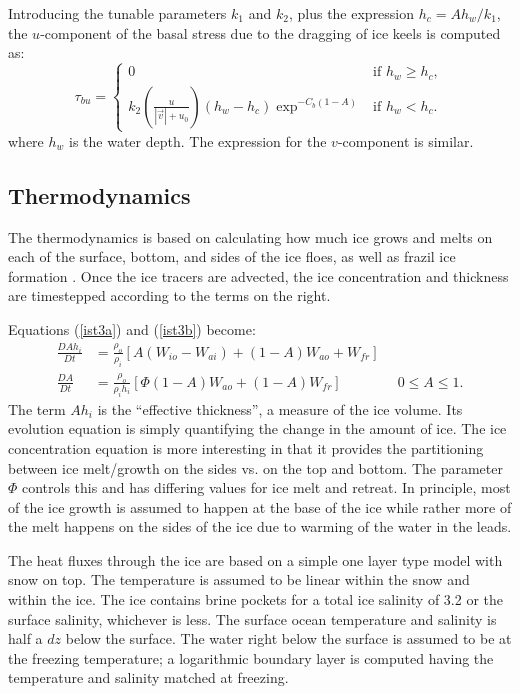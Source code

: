 Introducing the tunable parameters $k_1$ and $k_2$, plus the
expression $h_c = A h_w/k_1$, the $u$-component of the basal
stress due to the dragging of ice keels is computed as:
\begin{equation}
  \tau_{bu} = 
    \begin{cases}
      0& \text{if $h_w \geq h_c$},\\
      k_2 \left( \frac{u}{|\vec{v}| + u_0} \right)
            (h_w-h_c)\exp^{-C_b(1-A)}& \text{if $h_w < h_c$}.
    \end{cases}
\end{equation}
where $h_w$ is the water depth.
The expression for the $v$-component is similar.

\subsection{Thermodynamics}
\label{Growth}

The thermodynamics is based on calculating how much ice grows and
melts on each of the surface, bottom, and sides of the ice floes,
as well as frazil ice formation \citep{Mellor89}.
Once the ice tracers are advected, the ice concentration and
thickness are timestepped according to the terms on the right.

Equations (\ref{ist3a}) and (\ref{ist3b}) become:
\begin{align}
  \frac{D A h_i }{D t}
  & = \frac{\rho_o }{ \rho_i} \left[ A (W_{io} - W_{ai}) + (1-A) W_{ao}
  + W_{fr} \right]
\label{ist4a} \\
  \frac{D A }{ D t}
  & = \frac{\rho_o}{ \rho_i h_i} \left[ \Phi (1-A) W_{ao} + (1-A)
  W_{fr} \right] \qquad \qquad 0 \leq A \leq 1 .
\label{ist4b}
\end{align}
The term $Ah_i$ is the ``effective thickness'', a measure of the ice
volume. Its evolution equation is simply quantifying the change in
the amount of ice. The ice concentration equation is more interesting in
that it provides the partitioning between ice melt/growth on the sides
vs. on the top and bottom. The parameter $\Phi$ controls this and has
differing values for ice melt and retreat. In principle, most of the ice
growth is assumed to happen at the base of the ice while rather more of
the melt happens on the sides of the ice due to warming of the water in
the leads.

The heat fluxes through the ice are based on a simple one layer
\citet{Semtner76a} type model with snow on top. The temperature is
assumed to be linear within the snow and within the ice. The ice contains
brine pockets for a total ice salinity of 3.2 or the surface salinity,
whichever is less. The surface ocean temperature and salinity is half a
$dz$ below the surface. The water right below the surface is assumed to
be at the freezing temperature; a logarithmic boundary layer is computed
having the temperature and salinity matched at freezing.

